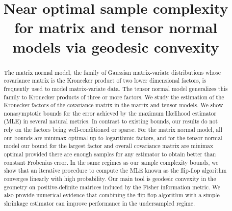 \documentclass[aos]{imsart}
\theoremstyle{definition}
\numberwithin{equation}{section}
\begin{document}
\begin{frontmatter}
\title{Near optimal sample complexity for matrix and tensor normal models via geodesic convexity}
\begin{abstract}
The matrix normal model, the family of Gaussian matrix-variate distributions whose covariance matrix is the Kronecker product of two lower dimensional factors, is frequently used to model matrix-variate data. The tensor normal model generalizes this family to Kronecker products of three or more factors. We study the estimation of the Kronecker factors of the covariance matrix in the matrix and tensor models. We show nonasymptotic bounds for the error achieved by the maximum likelihood estimator (MLE) in several natural metrics. In contrast to existing bounds, our results do not rely on the factors being well-conditioned or sparse. For the matrix normal model, all our bounds are minimax optimal up to logarithmic factors, and for the tensor normal model our bound for the largest factor and overall covariance matrix are minimax optimal provided there are enough samples for any estimator to obtain better than constant Frobenius error. In the same regimes as our sample complexity bounds, we show that an iterative procedure to compute the MLE known as the flip-flop algorithm converges linearly with high probability. Our main tool is geodesic convexity in the geometry on positive-definite matrices induced by the Fisher information metric. We also provide numerical evidence that combining the flip-flop algorithm with a simple shrinkage estimator can improve performance in the undersampled regime.


\end{abstract}
\end{frontmatter}
\end{document}
